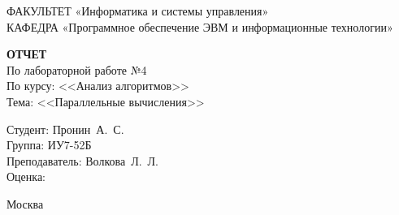 \begin{titlepage}
	{\doublespacing \small \raggedright ФАКУЛЬТЕТ \hspace{25mm} «Информатика и системы управления»\\
	КАФЕДРА \hspace{5mm} «Программное обеспечение ЭВМ и информационные технологии»\\}

	\vspace{30mm}
	
	\textbf{ОТЧЕТ}\\
	По лабораторной работе №4\\
	По курсу: <<Анализ алгоритмов>>\\
	Тема: <<Параллельные вычисления>>\\

	\vspace{60mm}

	\hspace{70mm} Студент:       \hfill Пронин~А.~С.\\
	\hspace{70mm} Группа:        \hfill ИУ7-52Б\\
	\hspace{70mm} Преподаватель: \hfill Волкова~Л.~Л.\\
	\hspace{70mm} Оценка:        \hfill \hrulefill\\

	\vfill
	
	Москва\\
	\the\year
\end{titlepage}

\setcounter{page}{2}